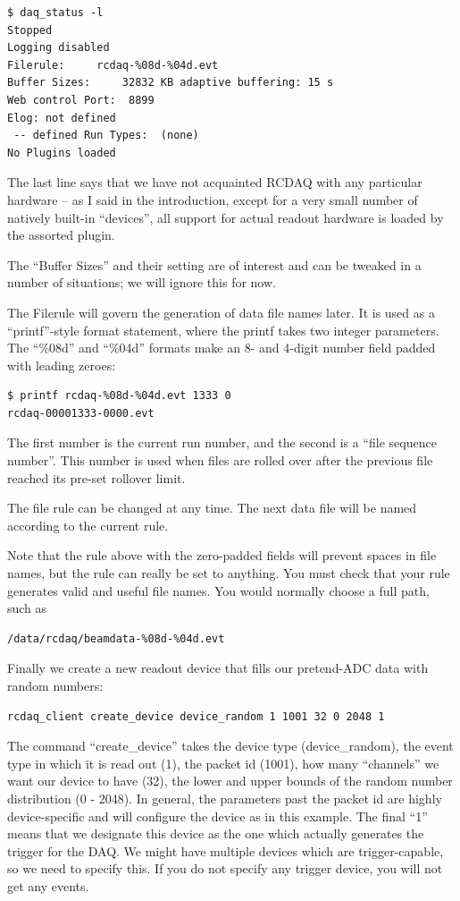 \documentclass{article}[11pt]
\begin{document}
\begin{verbatim}
$ daq_status -l
Stopped
Logging disabled
Filerule:     rcdaq-%08d-%04d.evt
Buffer Sizes:     32832 KB adaptive buffering: 15 s
Web control Port:  8899
Elog: not defined
 -- defined Run Types:  (none)
No Plugins loaded
\end{verbatim}

The last line says that we have not acquainted RCDAQ with any particular
hardware -- as I said in the introduction, except for a very small
number of natively built-in ``devices'', all support for actual
readout hardware is loaded by the assorted plugin.

The ``Buffer Sizes'' and their setting are of interest and can be
tweaked in a number of situations; we will ignore this for now.

The Filerule will govern the generation of data file names later. It
is used as a ``printf''-style format statement, where the printf takes
two integer parameters. The ``\%08d'' and ``\%04d'' formats make an 8-
and 4-digit number field padded with leading zeroes:

\begin{verbatim}
$ printf rcdaq-%08d-%04d.evt 1333 0 
rcdaq-00001333-0000.evt
\end{verbatim}

The first number is the current run number, and the second is a ``file
sequence number''. This number is used when files are rolled over after the
previous file reached its pre-set rollover limit.

The file rule can be changed at any time. The next data file will be
named according to the current rule.

Note that the rule above with the zero-padded fields will prevent
spaces in file names, but the rule can really be set to anything. You
must check that your rule generates valid and useful file names. You
would normally choose a full path, such as

\begin{verbatim}
/data/rcdaq/beamdata-%08d-%04d.evt 
\end{verbatim}


Finally we create a new readout device that fills our pretend-ADC data
with random numbers:

\begin{verbatim}
rcdaq_client create_device device_random 1 1001 32 0 2048 1
\end{verbatim}

The command ``create\_device'' takes the device type (device\_random),
the event type in which it is read out (1), the packet id (1001), how
many ``channels'' we want our device to have (32), the lower and upper
bounds of the random number distribution (0 - 2048). In general, the
parameters past the packet id are highly device-specific and will
configure the device as in this example.  The final ``1'' means that
we designate this device as the one which actually generates the
trigger for the DAQ. We might have multiple devices which are
trigger-capable, so we need to specify this. If you do not specify any
trigger device, you will not get any events.
\end{document}
